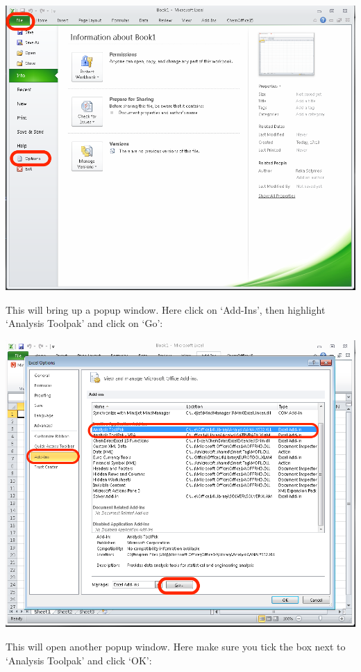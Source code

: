 \documentclass[]{book}
\theoremstyle{definition}
\theoremstyle{definition}
\theoremstyle{definition}
\theoremstyle{remark}
\begin{document}
\includegraphics{imgs/file_tab_options.png}

This will bring up a popup window. Here click on `Add-Ins', then
highlight `Analysis Toolpak' and click on `Go':

\includegraphics{imgs/install_analysis_toolpak.png}

This will open another popup window. Here make sure you tick the box
next to `Analysis Toolpak' and click `OK':
\end{document}
